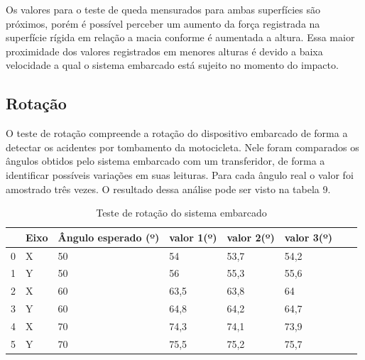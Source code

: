 Os valores para o teste de queda mensurados para ambas superfícies são próximos, porém é possível perceber um aumento da força registrada na superfície rígida em relação a macia conforme é aumentada a altura. Essa maior proximidade dos valores registrados em menores alturas é devido a baixa velocidade a qual o sistema embarcado está sujeito no momento do impacto.


\subsection{\textbf{Rotação}}
O teste de rotação compreende a rotação do dispositivo embarcado de forma a detectar os acidentes por tombamento da motocicleta. Nele foram comparados os ângulos obtidos pelo sistema embarcado com um transferidor, de forma a identificar possíveis variações em suas leituras. Para cada ângulo real o valor foi amostrado três vezes. O resultado dessa análise pode ser visto na tabela 9.


\begin{table}[H]
    \centering
    \caption{Teste de rotação do sistema embarcado}
    \begin{tabular*}{\textwidth}{l@{\extracolsep{\fill}}lllllll}
\toprule
{} &                 Eixo  &       Ângulo esperado (º) & valor 1(º) & valor 2(º) & valor 3(º) \\
\midrule
0 &              X     &   50      &        54 &                    53,7 &                    54,2  \\
1 &              Y &         50 &                    56 &                    55,3 &                     55,6  \\

2 &              X &         60 &                    63,5 &                    63,8 &                     64  \\

3 &              Y &         60 &                    64,8 &                    64,2 &                     64,7  \\

4 &              X &         70 &                    74,3 &                    74,1 &                     73,9  \\

5 &              Y &         70 &                    75,5 &                    75,2 &                     75,7  \\




\bottomrule
\end{tabular*}

\end{table}


